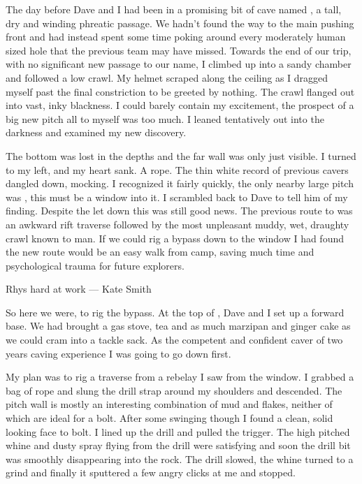 The day before Dave and I had been in a promising bit of cave named , a tall, dry and winding phreatic passage. We hadn't found the way to the main pushing front and had instead spent some time poking around every moderately human sized hole that the previous team may have missed. Towards the end of our trip, with no significant new passage to our name, I climbed up into a sandy chamber and followed a low crawl. My helmet scraped along the ceiling as I dragged myself past the final constriction to be greeted by nothing. The crawl flanged out into vast, inky blackness. I could barely contain my excitement, the prospect of a big new pitch all to myself was too much. I leaned tentatively out into the darkness and examined my new discovery. 

The bottom was lost in the depths and the far wall was only just visible. I turned to my left, and my heart sank. A rope. The thin white record of previous cavers dangled down, mocking. I recognized it fairly quickly, the only nearby large pitch was , this must be a window into it. I scrambled back to Dave to tell him of my finding. Despite the let down this was still good news. The previous route to  was an awkward rift traverse followed by the most unpleasant muddy, wet, draughty crawl known to man. If we could rig a bypass down to the window I had found the new route would be an easy walk from camp, saving much time and psychological trauma for future explorers.

\begin{pagefigure}
\label{}
\caption{Rhys hard at work --- Kate Smith}
\end{pagefigure}

So here we were, to rig the bypass. At the top of , Dave and I set up a forward base. We had brought a gas stove, tea and as much marzipan and ginger cake as we could cram into a tackle sack. As the competent and confident caver of two years caving experience I was going to go down first. 

My plan was to rig a traverse from a rebelay I saw from the window. I grabbed a bag of rope and slung the drill strap around my shoulders and descended. The pitch wall is mostly an interesting combination of mud and flakes, neither of which are ideal for a bolt. After some swinging though I found a clean, solid looking face to bolt. I lined up the drill and pulled the trigger. The high pitched whine and dusty spray flying from the drill were satisfying and soon the drill bit was smoothly disappearing into the rock. The drill slowed, the whine turned to a grind and finally it sputtered a few angry clicks at me and stopped. 


